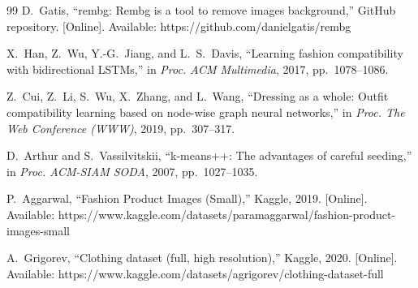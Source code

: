 \documentclass[conference]{IEEEtran}
\begin{document}
\begin{thebibliography}{99}
D.~Gatis, ``rembg: Rembg is a tool to remove images background,'' GitHub repository. [Online]. Available: https://github.com/danielgatis/rembg

X.~Han, Z.~Wu, Y.-G.~Jiang, and L.~S.~Davis, ``Learning fashion compatibility with bidirectional LSTMs,'' in \emph{Proc. ACM Multimedia}, 2017, pp.~1078--1086.

Z.~Cui, Z.~Li, S.~Wu, X.~Zhang, and L.~Wang, ``Dressing as a whole: Outfit compatibility learning based on node-wise graph neural networks,'' in \emph{Proc. The Web Conference (WWW)}, 2019, pp.~307--317.

D.~Arthur and S.~Vassilvitskii, ``k-means++: The advantages of careful seeding,'' in \emph{Proc. ACM-SIAM SODA}, 2007, pp.~1027--1035.

P.~Aggarwal, ``Fashion Product Images (Small),'' Kaggle, 2019. [Online]. Available: https://www.kaggle.com/datasets/paramaggarwal/fashion-product-images-small

A.~Grigorev, ``Clothing dataset (full, high resolution),'' Kaggle, 2020. [Online]. Available: https://www.kaggle.com/datasets/agrigorev/clothing-dataset-full

\end{thebibliography}
\end{document}

